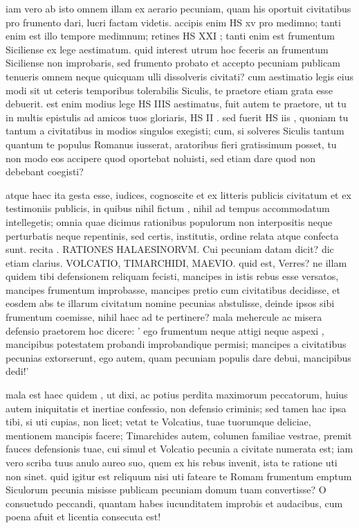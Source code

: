  iam vero ab isto omnem illam ex aerario pecuniam, quam his oportuit civitatibus pro frumento dari, lucri factam videtis. accipis enim HS xv pro medimno; tanti enim est illo tempore medimnum; retines HS XXI ; tanti enim est frumentum Siciliense ex lege aestimatum. quid interest utrum hoc feceris an frumentum Siciliense non improbaris, sed frumento probato et accepto pecuniam publicam tenueris omnem neque quicquam ulli dissolveris civitati? cum aestimatio legis eius modi sit ut ceteris temporibus tolerabilis Siculis, te praetore etiam grata esse debuerit. est enim modius lege HS IIIS aestimatus, fuit autem te praetore, ut tu in multis epistulis ad amicos tuos gloriaris, HS II . sed fuerit HS iis , quoniam tu tantum a civitatibus in modios singulos exegisti; cum, si solveres Siculis tantum quantum te populus Romanus iusserat, aratoribus fieri gratissimum posset, tu non modo eos accipere quod oportebat noluisti, sed etiam dare quod non debebant coegisti?

 atque haec ita gesta esse, iudices, cognoscite et ex litteris publicis civitatum et ex testimoniis publicis, in quibus nihil fictum , nihil ad tempus accommodatum intellegetis; omnia quae dicimus rationibus populorum non interpositis neque perturbatis neque repentinis, sed certis, institutis, ordine relata atque confecta sunt. recita . RATIONES HALAESINORVM. Cui pecuniam datam dicit? dic etiam clarius. VOLCATIO, TIMARCHIDI, MAEVIO. quid est, Verres? ne illam quidem tibi defensionem reliquam fecisti, mancipes in istis rebus esse versatos, mancipes frumentum improbasse, mancipes pretio cum civitatibus decidisse, et eosdem abs te illarum civitatum nomine pecunias abstulisse, deinde ipsos sibi frumentum coemisse, nihil haec ad te pertinere? mala mehercule ac misera defensio praetorem hoc dicere: ' ego frumentum neque attigi neque aspexi , mancipibus potestatem probandi improbandique permisi; mancipes a civitatibus pecunias extorserunt, ego autem, quam pecuniam populis dare debui, mancipibus dedi!'

 mala est haec quidem , ut dixi, ac potius perdita maximorum peccatorum, huius autem iniquitatis et inertiae confessio, non defensio criminis; sed tamen hac ipsa tibi, si uti cupias, non licet; vetat te Volcatius, tuae tuorumque deliciae, mentionem mancipis facere; Timarchides autem, columen familiae vestrae, premit fauces defensionis tuae, cui simul et Volcatio pecunia a civitate numerata est; iam vero scriba tuus anulo aureo suo, quem ex his rebus invenit, ista te ratione uti non sinet. quid igitur est reliquum nisi uti fateare te Romam frumentum emptum Siculorum pecunia misisse publicam pecuniam domum tuam convertisse? O consuetudo peccandi, quantam habes iucunditatem improbis et audacibus, cum poena afuit et licentia consecuta est!

